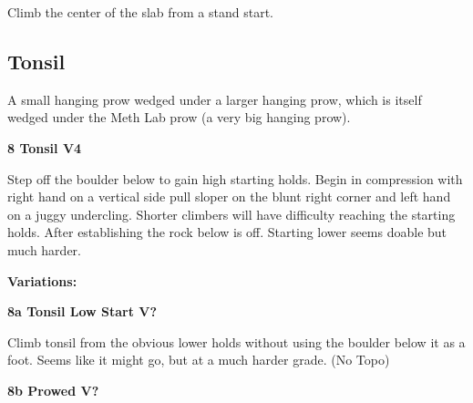 \begin{multicols}{2}
\begin{minipage}{\linewidth}
					\begin{adjustwidth}{0.5cm}{}				
					Climb the center of the slab from a stand start.
					\end{adjustwidth}
					\end{minipage}
			\begin{minipage}{\columnwidth}
			\subsection*{Tonsil}\label{bf:Tonsil}
			A small hanging prow wedged under a larger hanging prow, which is itself wedged under the Meth Lab prow (a very big hanging prow).
			
			\end{minipage}
			

					\begin{minipage}{\linewidth}	
					\label{rt:Tonsil}
\colorbox{RoyalBlue!20}{
\parbox{0.95\textwidth}{
\textbf{
8 Tonsil V4    
}
}
}

					\begin{adjustwidth}{0.5cm}{}				
					Step off the boulder below to gain high starting holds. Begin in compression with right hand on a vertical side pull sloper on the blunt right corner and left hand on a juggy undercling.  Shorter climbers will have difficulty reaching the starting holds. After establishing the rock below is off. Starting lower seems doable but much harder.
					\end{adjustwidth}
					\end{minipage}
						\begin{adjustwidth}{0.5cm}{}				
						\textbf{Variations:} \newline
							\begin{minipage}{\linewidth}	
							\label{vr:Tonsil Low Start}
\colorbox{black!20}{
\parbox{0.95\textwidth}{
\textbf{
8a Tonsil Low Start V?  
}
}
}

							\begin{adjustwidth}{0.5cm}{}				
							Climb tonsil from the obvious lower holds without using the boulder below it as a foot. Seems like it might go, but at a much harder grade.
								\newline (No Topo) 
							\end{adjustwidth}
							\end{minipage}
							\begin{minipage}{\linewidth}	
							\label{vr:Prowed}
\colorbox{black!20}{
\parbox{0.95\textwidth}{
\textbf{
8b Prowed V?  \warn \warn 
}
}
}


\end{minipage}
\end{adjustwidth}
\end{multicols}
